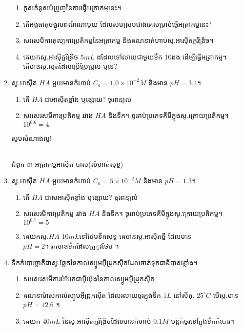 \documentclass[12pt, a5paper]{article}
\begin{document}
\begin{enumerate}[m]
	\begin{enumerate}[k]
		\item គូសគំនូសបំព្រួញនៃការធ្វើអត្រាកម្មនេះ។
		\item តើអង្គធាតុចង្អុលពណ៍ណាមួយ ដែលសមស្របជាងគេសម្រាប់ធ្វើអត្រាកម្មនេះ?
		\item សរសេមីការតុល្យការប្រតិកម្មនៃអត្រាកម្ម និងគណនាកំហាប់សូ.អាស៊ីតក្លរីឌ្រិច។
		\item គេយកសូ.អាស៊ីក្លរីឌ្រិច $5mL$ ដដែលទៅលាយជាមួយទឹក $10$ដង ដើម្បីធ្វើអត្រាកម្ម។ តើមាឌសូ.ស៊ូតដែលប្រើប្រែប្រួល ឬទេ?
	\end{enumerate}
	\item សូ.អាស៊ីត $HA$ មួយមានកំហាប់ $C_a=1.0\times10^{-2}M$ និងមាន $pH=3.4$។
	\begin{enumerate}[k]
		\item តើ $HA$ ជាអាស៊ីតខ្លាំង ឬខ្សោយ? ចូរពន្យល់
		\item សរសេរសមីការប្រតិកម្ម រវាង $HA$ និងទឹក។ ចូររាប់ប្រភេទគីមីក្នុងសូ.ក្រោយប្រតិកម្ម។ $10^{0.6}=4$
	\end{enumerate}
	\begin{center}
		\sffamily\color{black}
		សូមសំណាងល្អ!
	\end{center}\newpage
	\begin{center}
		\sffamily\color{black}
		\\
		ជំពូក ៣ អត្រាកម្មអាស៊ីត-បាស(លំហាត់សុទ្ធ)
	\end{center}
	\item សូ.អាស៊ីត $HA$ មួយមានកំហាប់ $C_a=5\times10^{-2}M$ និងមាន $pH=1.3$។
	\begin{enumerate}[k]
		\item តើ $HA$ ជាសអាស៊ីតខ្លាំង ឬខ្សោយ? ចូរពន្យល់
		\item សរសេរមីការប្រតិកម្ម រវាង $HA$ និងទឹក។ ចូររាប់ប្រភេទគីមីក្នុងសូ.ក្រោយប្រតិកម្ម។ $10^{0.7}=5$
		\item គេយកសូ.$HA$ $10mL$ទៅថែមទឹកសុទ្ធ គេបានសូ.អាស៊ីតថ្មី ដែលមាន\\$pH=2$។  រកមាឌទឹកដែលត្រូូវថែម ។
	\end{enumerate}
	\item ទឹកកំបោរថ្លាគឺជាសូ.ឆ្អែតនៃកាល់ស្យូមអ៊ីដ្រុកស៊ីតដែលចាត់ទុកជាឌីបាសខ្លាំង។
	\begin{enumerate}[k]
		\item សរសេរសមីការបំបែកជាអ៊ីយ៉ុងនៃកាល់ស្យូមអ៊ីដ្រុកស៊ីត
		\item គណនាម៉ាសកាល់ស្យូមអ៊ីដ្រុកស៊ីត ដែលរលាយចូរក្នុងទឹក $1L$ នៅសីតុ. $25^\circ C$ បើសូ.មាន$pH=12.6$ ។
		\item គេយក $40mL$ នៃសូ.អាស៊ីតក្លរីឌ្រិចដែលមានកំហាប់ $0.1M$ បន្តក់ចូរទៅក្នុងទឹកកំបោរ។

\end{enumerate}
\end{enumerate}
\end{document}
